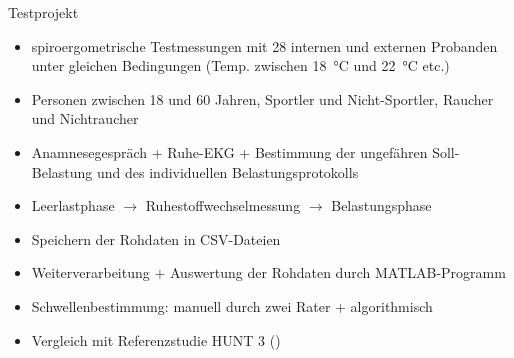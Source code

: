 \documentclass[colorBG,slideColor,8pt]{beamer}
\begin{document}
\begin{frame}{Testprojekt}
\begin{itemize}
	\item spiroergometrische Testmessungen mit 28 internen und externen Probanden unter gleichen Bedingungen (Temp. zwischen \SI{18}{\degreeCelsius} und \SI{22}{\degreeCelsius} etc.)
	\item Personen zwischen 18 und 60 Jahren, Sportler und Nicht-Sportler, Raucher und Nichtraucher
	\item Anamnesegespräch + Ruhe-EKG + Bestimmung der ungefähren Soll-Belastung und des individuellen Belastungsprotokolls
	\item Leerlastphase $\rightarrow$ Ruhestoffwechselmessung $\rightarrow$ Belastungsphase
	\item Speichern der Rohdaten in CSV-Dateien
	\item Weiterverarbeitung + Auswertung der Rohdaten durch MATLAB-Programm
	\item Schwellenbestimmung: manuell durch zwei Rater + algorithmisch
	\item Vergleich mit Referenzstudie HUNT 3 (\cite{Loe.2014})
\end{itemize}
\end{frame}
\end{document}
